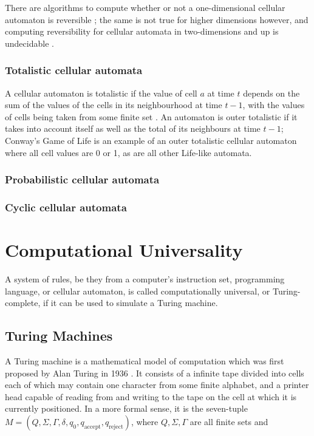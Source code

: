 \documentclass[11pt,a4paper]{article}
\begin{document}
    There are algorithms to compute whether or not a one-dimensional cellular
    automaton is reversible \cite{oneDReversible}; the same is not true for
    higher dimensions however, and computing reversibility for cellular automata
    in two-dimensions and up is undecidable \cite{twoDUndecidable}.

    \subsubsection{Totalistic cellular automata}
    A cellular automaton is totalistic if the value of cell $a$ at time $t$
    depends on the sum of the values of the cells in its neighbourhood at time
    $t-1$, with the values of cells being taken from some finite set
    \cite{totalistic}. An automaton is outer totalistic if it takes into account
    itself as well as the total of its neighbours at time $t-1$; Conway's Game
    of Life is an example of an outer totalistic cellular automaton where all
    cell values are 0 or 1, as are all other Life-like automata.

    \subsubsection{Probabilistic cellular automata}
    \subsubsection{Cyclic cellular automata}

\section{Computational Universality}
    A system of rules, be they from a computer's instruction set, programming
    language, or cellular automaton, is called computationally universal, or
    Turing-complete, if it can be used to simulate a Turing machine.

    \subsection{Turing Machines}
    A Turing machine is a mathematical model of computation which was first
    proposed by Alan Turing in 1936 \cite{SipserToC}. It consists of a infinite
    tape divided into cells each of which may contain one character from some
    finite alphabet, and a printer head capable of reading from and writing to the
    tape on the cell at which it is currently positioned. In a more formal
    sense, it is the seven-tuple $M=(Q, \Sigma, \Gamma, \delta, q_0,
    q_{\text{accept}}, q_{\text{reject}})$, where $Q, \Sigma, \Gamma$ are all
    finite sets and
\end{document}
